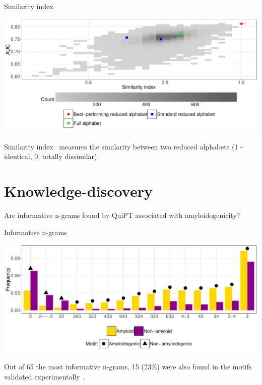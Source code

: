 \documentclass{beamer}\usepackage[]{graphicx}\usepackage[]{color}
\makeatletter
\def\maxwidth{ %
  \ifdim\Gin@nat@width>\linewidth
    \linewidth
  \else
    \Gin@nat@width
  \fi
}
\newenvironment{knitrout}{}{} %
\makeatother
\begin{document}
\begin{frame}{Similarity index}
\begin{knitrout}
\color{fgcolor}

{\centering \includegraphics[width=\maxwidth]{figure/unnamed-chunk-5-1} 

}



\end{knitrout}
Similarity index~\citep{stephenson_unearthing_2013} measures the similarity between two reduced alphabets (1 - identical, 0, totally dissimilar).
\end{frame}

\section{Knowledge-discovery}

\begin{frame}{}
Are informative n-grams found by QuiPT associated with amyloidogenicity?
\end{frame}


\begin{frame}{Informative n-grams}
\begin{knitrout}
\color{fgcolor}

{\centering \includegraphics[width=\maxwidth]{figure/unnamed-chunk-6-1} 

}



\end{knitrout}

Out of 65 the most informative n-grams, 15 (23\%) were also found in the motifs validated experimentally~\citep{paz_sequence_2004}.
\end{frame}
\end{document}
